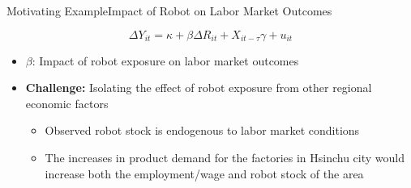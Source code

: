\documentclass[dvipsnames,hyperref={pdfpagelabels=false}]{beamer}
\begin{document}
	\begin{frame}{Motivating Example}{Impact of Robot on Labor Market Outcomes}
	
	
	\begin{equation*}
		\Delta Y_{it} = \kappa + \beta \Delta R_{it} + X_{it-\tau} \gamma  + u_{it}
	\end{equation*}
	\begin{itemize}
		
		\item $\beta$: Impact of robot exposure on labor market outcomes
					\vspace{0.2cm}
		
			\item \textbf{Challenge:} Isolating the effect of robot exposure from other regional economic factors										
		\begin{itemize}
			
			\vspace{0.2cm}
			\item  Observed robot stock is endogenous to labor market conditions
			\vspace{0.2cm}
			\item  The increases in product demand for the factories in Hsinchu city would increase both the employment/wage and robot stock of the area
			
		\end{itemize}
		
		
	\end{itemize}
\end{frame}
\end{document}
